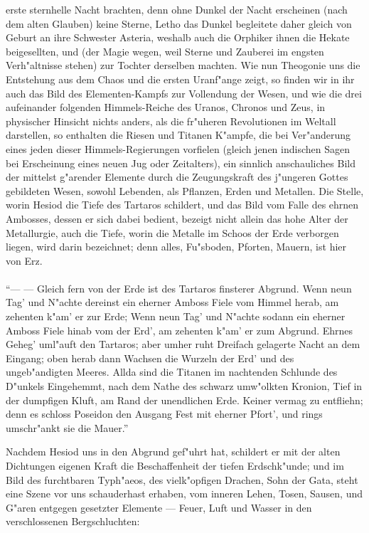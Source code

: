 \documentclass[a4paper, 11pt, oneside, polutonikogreek, german]{article}
\begin{document}
\begin{enumerate}
erste sternhelle Nacht brachten, denn ohne Dunkel der Nacht erscheinen (nach dem alten Glauben) keine Sterne, Letho das Dunkel begleitete daher gleich von Geburt an ihre Schwester Asteria, weshalb auch die Orphiker ihnen die Hekate beigesellten, und (der Magie wegen, weil Sterne und Zauberei im engsten Verh"altnisse stehen) zur Tochter derselben machten. Wie nun Theogonie uns die Entstehung aus dem Chaos und die ersten Uranf"ange zeigt, so finden wir in ihr auch das Bild des Elementen-Kampfs zur Vollendung der Wesen, und wie die drei aufeinander folgenden Himmels-Reiche des Uranos, Chronos und Zeus, in physischer Hinsicht nichts anders, als die fr"uheren Revolutionen im Weltall darstellen, so enthalten die Riesen und Titanen K"ampfe, die bei Ver"anderung eines jeden dieser Himmels-Regierungen vorfielen (gleich jenen indischen Sagen bei Erscheinung eines neuen Jug oder Zeitalters), ein sinnlich anschauliches Bild der mittelst g"arender Elemente durch die Zeugungskraft des j"ungeren Gottes gebildeten Wesen, sowohl Lebenden, als Pflanzen, Erden und Metallen. Die Stelle, worin Hesiod die Tiefe des Tartaros schildert, und das Bild vom Falle des ehrnen Ambosses, dessen er sich dabei bedient, bezeigt nicht allein das hohe Alter der Metallurgie, auch die Tiefe, worin die Metalle im Schoos der Erde verborgen liegen, wird darin bezeichnet; denn alles, Fu"sboden, Pforten, Mauern, ist hier von Erz.
\end{enumerate}
\paragraph{}
"`--- --- Gleich fern von der Erde ist des Tartaros finsterer Abgrund. Wenn neun Tag' und N"achte dereinst ein eherner Amboss Fiele vom Himmel herab, am zehenten k"am' er zur Erde; Wenn neun Tag' und N"achte sodann ein eherner Amboss Fiele hinab vom der Erd', am zehenten k"am' er zum Abgrund. Ehrnes Geheg' uml"auft den Tartaros; aber umher ruht Dreifach gelagerte Nacht an dem Eingang; oben herab dann Wachsen die Wurzeln der Erd' und des ungeb"andigten Meeres. Allda sind die Titanen im nachtenden Schlunde des D"unkels Eingehemmt, nach dem Nathe des schwarz umw"olkten Kronion, Tief in der dumpfigen Kluft, am Rand der unendlichen Erde. Keiner vermag zu entfliehn; denn es schloss Poseidon den Ausgang Fest mit eherner Pfort', und rings umschr"ankt sie die Mauer."'

Nachdem Hesiod uns in den Abgrund gef"uhrt hat, schildert er mit der alten Dichtungen eigenen Kraft die Beschaffenheit der tiefen Erdschk"unde; und im Bild des furchtbaren Typh"aeos, des vielk"opfigen Drachen, Sohn der Gata, steht eine Szene vor uns schauderhast erhaben, vom inneren Lehen, Tosen, Sausen, und G"aren entgegen gesetzter Elemente --- Feuer, Luft und Wasser in den verschlossenen Bergschluchten:
\end{document}
